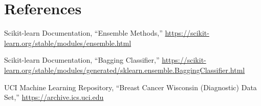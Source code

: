\documentclass[12pt,a4paper]{article}
\begin{document}
\section{References}
\begin{enumerate}[label={[\arabic*]}]
\item Scikit-learn Documentation, ``Ensemble Methods,'' \url{https://scikit-learn.org/stable/modules/ensemble.html}
\item Scikit-learn Documentation, ``Bagging Classifier,'' \url{https://scikit-learn.org/stable/modules/generated/sklearn.ensemble.BaggingClassifier.html}
\item UCI Machine Learning Repository, ``Breast Cancer Wisconsin (Diagnostic) Data Set,'' \url{https://archive.ics.uci.edu}
\end{enumerate}
\end{document}
